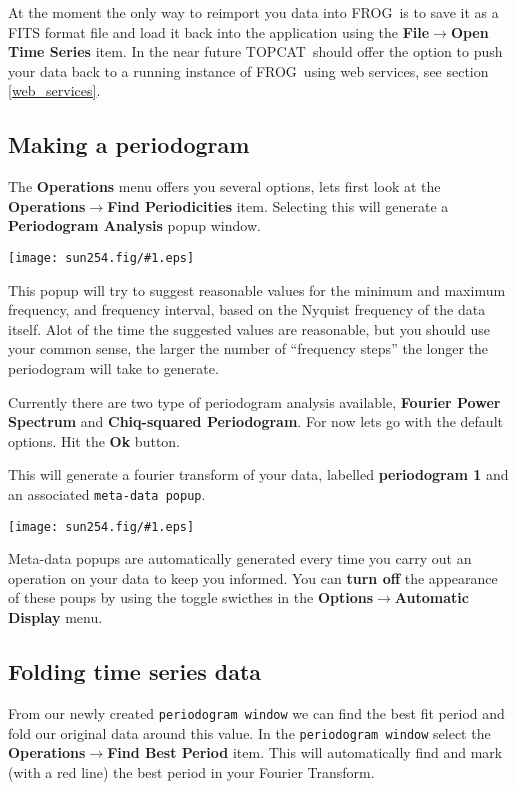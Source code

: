 \documentclass[twoside,11pt]{article}
\newcommand{\htmladdimg}[1]{}
\newcommand{\htmlref}[2]{#1}
\newcommand{\latex}[1]{#1}
\newcommand{\latexhtml}[2]{#1}
\newcommand{\xlabel}[1]{}
\renewcommand{\_}{\texttt{\symbol{95}}}
\newcommand{\FROG}{\textsf{FROG}}
\newcommand{\TOPCAT}{\textsf{TOPCAT}}
\newcommand{\mainfigure}[1]
{\begin{center}
 \latexhtml{\texttt{[image: sun254.fig/\#1.eps]}}{\htmladdimg{../sun254.fig/#1.gif}}
 \end{center}
}
\newcommand{\menuitem}[1]{\textbf{#1}}
\newcommand{\submenuitem}[2]{\latexhtml{\textbf{#1$\rightarrow$#2}}{\textbf{#1=>#2}}}
\newcommand{\labelitem}[1]{\textbf{#1}}
\newcommand{\hitext}[1]{\texttt{#1}}
\begin{document}
At the moment the only way to reimport you data into \FROG\ is to save it as a FITS format file and load it back into the application using the \submenuitem{File}{Open Time Series} item. In the near future \TOPCAT\ should offer the option to push your data back to a running instance of \FROG\ using  \htmlref{web services}{web_services}\latex{, see section \ref{web_services}}.

\subsection{Making a periodogram\xlabel{making_a_periodogram}}

The \menuitem{Operations} menu offers you several options, lets first look at the \submenuitem{Operations}{Find Periodicities} item. Selecting this will generate a \labelitem{Periodogram Analysis} popup window.

\mainfigure{periodogram_popup}

This popup will try to suggest reasonable values for the minimum and maximum frequency, and frequency interval, based on the Nyquist frequency of the data itself. Alot of the time the suggested values are reasonable, but you should use your common sense, the larger the number of ``frequency steps'' the longer the periodogram will take to generate.

Currently there are two type of periodogram analysis available, \labelitem{Fourier Power Spectrum} and \labelitem{Chiq-squared Periodogram}. For now lets go with the default options. Hit the \labelitem{Ok} button.

This will generate a fourier transform of your data, labelled \labelitem{periodogram 1} and an associated \hitext{meta-data popup}. 

\mainfigure{fft}

Meta-data popups are automatically generated every time you carry out an operation on your data to keep you informed. You can {\bf turn off} the appearance of these poups by using the toggle swicthes in the \submenuitem{Options}{Automatic Display} menu.

\subsection{Folding time series data\xlabel{folding_data}\label{folding_data}}

From our newly created \hitext{periodogram window} we can find the best fit period and fold our original data around this value. In the \hitext{periodogram window} select the \submenuitem{Operations}{Find Best Period} item. This will automatically find and mark (with a red line) the best period in your Fourier Transform.
\end{document}
